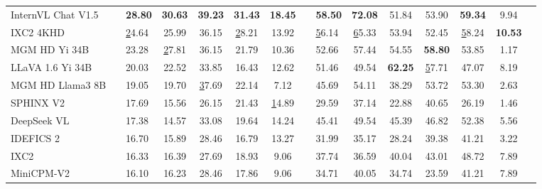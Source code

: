 \begin{table}[h]
{\begin{tabular}{llacccccacccccc@{}}
InternVL Chat V1.5 \cite{chen2024far}      &  & \textbf{28.80} & \textbf{30.63} & \textbf{39.23} & \textbf{31.43} & \textbf{18.45} &  & \textbf{58.50} & \textbf{72.08} & 51.84          & 53.90          & \textbf{59.34} & 9.94           \\
IXC2 4KHD \cite{dong2024internlmxcomposer24khd} &  & {\ul 24.64}    & 25.99          & 36.15          & {\ul 28.21}    & 13.92          &  & {\ul 56.14}    & {\ul 65.33}    & 53.94          & 52.45          & {\ul 58.24}    & \textbf{10.53} \\
MGM HD Yi 34B \cite{li2024minigemini}           &  & 23.28          & {\ul 27.81}    & 36.15          & 21.79          & 10.36          &  & 52.66          & 57.44          & 54.55          & \textbf{58.80} & 53.85          & 1.17           \\
LLaVA 1.6 Yi 34B \cite{liu2024llavanext}        &  & 20.03          & 22.52          & 33.85          & 16.43          & 12.62          &  & 51.46          & 49.54          & \textbf{62.25} & {\ul 57.71}    & 47.07          & 8.19           \\
MGM HD Llama3 8B \cite{li2024minigemini}        &  & 19.05          & 19.70          & {\ul 37.69}    & 22.14          & 7.12           &  & 45.69          & 54.11          & 38.29          & 53.72          & 53.30          & 2.63           \\
SPHINX V2 \cite{gao2024sphinxx}               &  & 17.69          & 15.56          & 26.15          & 21.43          & {\ul 14.89}    &  & 29.59          & 37.14          & 22.88          & 40.65          & 26.19          & 1.46           \\
DeepSeek VL \cite{lu2024deepseekvl}             &  & 17.38          & 14.57          & 33.08          & 19.64          & 14.24          &  & 45.41          & 49.54          & 45.39          & 46.82          & 52.38          & 5.56           \\
IDEFICS 2 \cite{laurenccon2024matters}               &  & 16.70          & 15.89          & 28.46          & 16.79          & 13.27          &  & 31.99          & 35.17          & 28.24          & 39.38          & 41.21          & 3.22           \\
IXC2 \cite{chen2023internvl}      &  & 16.33          & 16.39          & 27.69          & 18.93          & 9.06           &  & 37.74          & 36.59          & 40.04          & 43.01          & 48.72          & 7.89           \\
MiniCPM-V2 \cite{viscpm}              &  & 16.10          & 16.23          & 28.46          & 17.86          & 9.06           &  & 34.71          & 40.05          & 34.74          & 23.59          & 41.21          & 7.89           \\

\end{tabular}}
\end{table}
